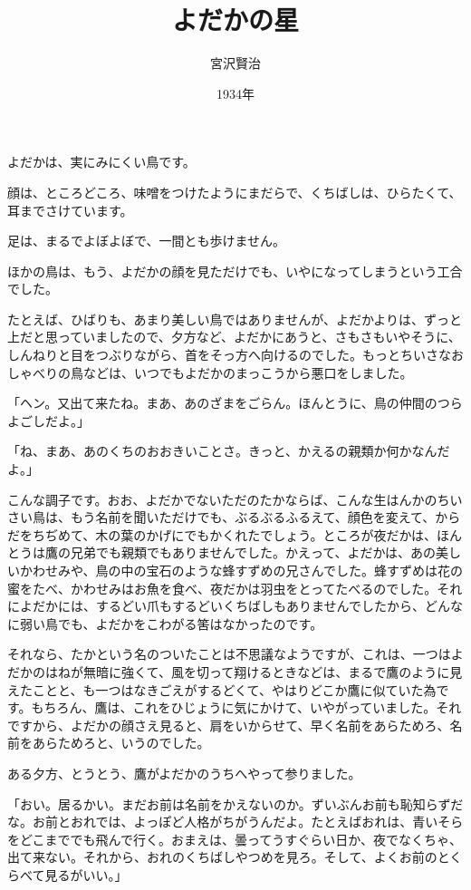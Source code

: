 \documentclass[a4paper, platex, dvipdfmx]{jsarticle}
\title{よだかの星}
\author{宮沢賢治}
\date{1934年}
\begin{document}
\maketitle
よだかは、実にみにくい鳥です。

顔は、ところどころ、味噌をつけたようにまだらで、くちばしは、ひらたくて、耳までさけています。

足は、まるでよぼよぼで、一間とも歩けません。

ほかの鳥は、もう、よだかの顔を見ただけでも、いやになってしまうという工合でした。

たとえば、ひばりも、あまり美しい鳥ではありませんが、よだかよりは、ずっと上だと思っていましたので、夕方など、よだかにあうと、さもさもいやそうに、しんねりと目をつぶりながら、首をそっ方へ向けるのでした。もっとちいさなおしゃべりの鳥などは、いつでもよだかのまっこうから悪口をしました。

「ヘン。又出て来たね。まあ、あのざまをごらん。ほんとうに、鳥の仲間のつらよごしだよ。」

「ね、まあ、あのくちのおおきいことさ。きっと、かえるの親類か何かなんだよ。」

こんな調子です。おお、よだかでないただのたかならば、こんな生はんかのちいさい鳥は、もう名前を聞いただけでも、ぶるぶるふるえて、顔色を変えて、からだをちぢめて、木の葉のかげにでもかくれたでしょう。ところが夜だかは、ほんとうは鷹の兄弟でも親類でもありませんでした。かえって、よだかは、あの美しいかわせみや、鳥の中の宝石のような蜂すずめの兄さんでした。蜂すずめは花の蜜をたべ、かわせみはお魚を食べ、夜だかは羽虫をとってたべるのでした。それによだかには、するどい爪もするどいくちばしもありませんでしたから、どんなに弱い鳥でも、よだかをこわがる筈はなかったのです。

それなら、たかという名のついたことは不思議なようですが、これは、一つはよだかのはねが無暗に強くて、風を切って翔けるときなどは、まるで鷹のように見えたことと、も一つはなきごえがするどくて、やはりどこか鷹に似ていた為です。もちろん、鷹は、これをひじょうに気にかけて、いやがっていました。それですから、よだかの顔さえ見ると、肩をいからせて、早く名前をあらためろ、名前をあらためろと、いうのでした。

ある夕方、とうとう、鷹がよだかのうちへやって参りました。

「おい。居るかい。まだお前は名前をかえないのか。ずいぶんお前も恥知らずだな。お前とおれでは、よっぽど人格がちがうんだよ。たとえばおれは、青いそらをどこまででも飛んで行く。おまえは、曇ってうすぐらい日か、夜でなくちゃ、出て来ない。それから、おれのくちばしやつめを見ろ。そして、よくお前のとくらべて見るがいい。」
\end{document}
